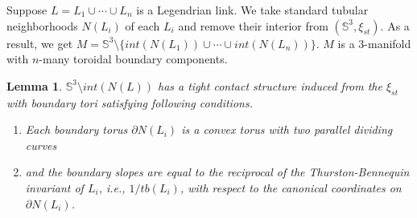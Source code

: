 \documentclass{amsart}
\theoremstyle{plain}
\newtheorem{lem}{Lemma}
\theoremstyle{remark}
\newtheorem{rem}{Remark}
\theoremstyle{definition}
\newcommand{\s}{\mathbb{S}}
\newcommand{\dd}{\partial}
\begin{document}

Suppose $L=L_1\cup \cdots \cup L_n$ is a Legendrian link.
We take standard tubular neighborhoods $N(L_i)$ of each $L_i$ and remove their interior from $\left(\s^3, \xi_{st}\right)$. 
As a result, we get $M= \s^3 \setminus \{int(N(L_1))\cup \cdots \cup int(N(L_n))\}$. 
$M$ is a 3-manifold with $n$-many toroidal boundary components. 

\begin{lem}\label{lem: Remove_N(L)}
    $\s^3 \setminus int (N(L))$ has a tight contact structure induced from the $\xi_{st}$ with boundary tori satisfying following conditions. 
    
    \begin{enumerate}
        \item Each boundary torus $\dd N(L_i)$ is a convex torus with two parallel dividing curves 
        \item and the boundary slopes are equal to the reciprocal of the Thurston-Bennequin invariant of $L_i$, i.e., $1/tb(L_i)$, with respect to the canonical coordinates on $\dd N(L_i)$.
    \end{enumerate}
\end{lem}
\end{document}
